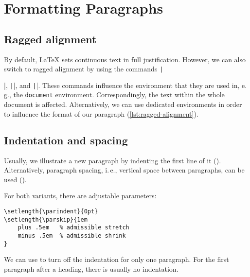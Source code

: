 \chapter{Formatting Paragraphs} %
\label{sec:formatting-paragraphs}

\section*{Ragged alignment}
\label{sec:ragged-alignment}
By default, \LaTeX{} sets continuous text in full justification. 
However, we can also switch to ragged alignment by using the commands 
\texttt|\raggedright|, \texttt|\raggedleft|, and 
\texttt|\centering|. 
These commands influence the environment that they are used in, e.\,g., the 
\texttt{document} environment. Correspondingly, the text within the whole 
document is affected. 
Alternatively, we can use dedicated environments in order to influence the 
format 
of our paragraph (\cref{lst:ragged-alignment}).


\section*{Indentation and spacing}
\label{sec:indents-and-parskips}
Usually, we illustrate a new paragraph by indenting the first line of it 
(\texttt{\parindent}). 
Alternatively, paragraph spacing, i.\,e., vertical space between paragraphs, 
can be used (\texttt{\parskip}).

For both variants, there are adjustable parameters:
\begin{verbatim}
\setlength{\parindent}{0pt}
\setlength{\parskip}{1em
    plus .5em   % admissible stretch
    minus .5em  % admissible shrink
}
\end{verbatim}

We can use \texttt{\noindent} to turn off the indentation for only one 
paragraph. 
For the first paragraph after a heading, there is usually no indentation. 

